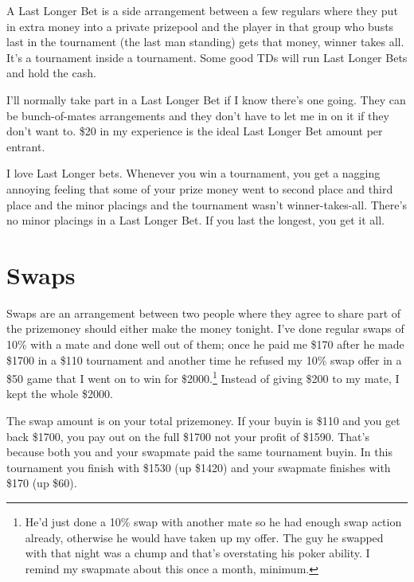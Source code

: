 A Last Longer Bet is a side arrangement between a few regulars
where they put in extra money into a private prizepool and the player
in that group who busts last in the tournament (the last man standing)
gets that money, winner takes all. It's a tournament inside a tournament.
Some good TDs will run Last Longer Bets and hold the cash.

I'll normally take part in a Last Longer Bet if I know there's one
going. They can be bunch-of-mates arrangements and
they don't have to let me in on it if they don't want to. \$20 in my
experience is the ideal Last Longer Bet amount per entrant.

I love Last Longer bets. Whenever you win a tournament, you get a
nagging annoying feeling that some of your prize money went to second
place and third place and the minor placings and the tournament wasn't
winner-takes-all. There's no minor placings in a Last Longer Bet. If
you last the longest, you get it all.

\newpage

\section{Swaps}


Swaps are an arrangement between two people where they
agree to share part of the prizemoney should
either make the money tonight. I've done regular swaps of 10\% with a mate and
done well out of them; once he paid me
\$170 after he made \$1700 in a \$110 tournament and another time
he refused my 10\% swap offer in a \$50 game that I
went on to win for \$2000.\footnote{He'd
just done a 10\% swap with another mate so he had enough swap action
already, otherwise he would have taken up my offer. The
guy he swapped with that night was a chump and that's
overstating his poker ability. I remind my swapmate about this once
a month, minimum.} Instead of giving \$200 to my mate, I kept the whole
\$2000.

The swap amount is on your total prizemoney. If your buyin is
\$110 and you get back \$1700, you pay out on the full
\$1700 not your profit of \$1590. That's because both you and your
swapmate paid the same tournament buyin.
In this tournament you finish with \$1530 (up \$1420) and your swapmate
finishes with \$170 (up \$60).

